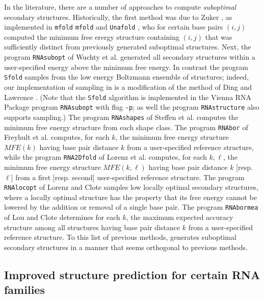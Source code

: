 In the literature, there are a number of approaches to compute
{\em suboptimal} secondary structures. Historically, the first
method was due to Zuker \cite{Zuk89a}, as implemented in {\tt mfold}
{\tt mfold} \cite{Zuk89a} and {\tt Unafold} \cite{Markham.mmb08},
who for certain base pairs $(i,j)$ computed the minimum
free erergy structure containing $(i,j)$ that was sufficiently distinct
from previously generated suboptimal structures.
Next, the program {\tt RNAsubopt} of Wuchty et al.
\cite{wuchtyFontanaHofackerSchuster} generated all secondary structures
within a user-specified energy above the minimum free energy.
In contrast the program {\tt Sfold} \cite{Ding.nar03} samples from
the low energy Boltzmann ensemble of structures; indeed, our implementation
of sampling in {\rnahairpin} is a modification of the method of
Ding and Lawrence \cite{Ding.nar03}. (Note that the {\tt Sfold} algorithm
is implemented in the Vienna RNA Package program
{\tt RNAsubopt} with flag {\tt -p}; as well the program
{\tt RNAstructure} \cite{mathewsConstraints} also supports sampling.)
The program {\tt RNAshapes} of Steffen et al.
\cite{giegerich:shapesBioinf} computes the minimum free energy structure
from each shape class.
The program {\tt RNAbor} of Freyhult et al. \cite{Freyhult.b07}
computes, for each $k$,
the minimum free energy structure $MFE(k)$ having base pair
distance $k$ from a user-specified reference structure, while the
program {\tt RNA2Dfold} of Lorenz et al. \cite{hofacker:RNAbor2D}
computes, for each $k,\ell$, the minimum free energy structure
$MFE(k,\ell)$ having base pair
distance $k$ [resp. $\ell$] from a first [resp. second]
user-specified reference structure.
The program {\tt RNAlocopt} of Lorenz and Clote  \cite{RNAlocopt}
samples low  locally optimal secondary structures, where a locally
optimal structure has the property that its free energy cannot be lowered
by the addition or removal of a single base pair. The program
{\tt RNAbormea} of Lou and Clote \cite{Clote.bb12} determines
for each $k$, the maximum expected accuracy structure among all structures
having base pair distance $k$ from a user-specified reference structure.
To this list of previous methods, {\rnahairpin} generates suboptimal
secondary structures in a manner that seems orthogonal to previous methods.

\subsection{Improved structure prediction for certain RNA families}


